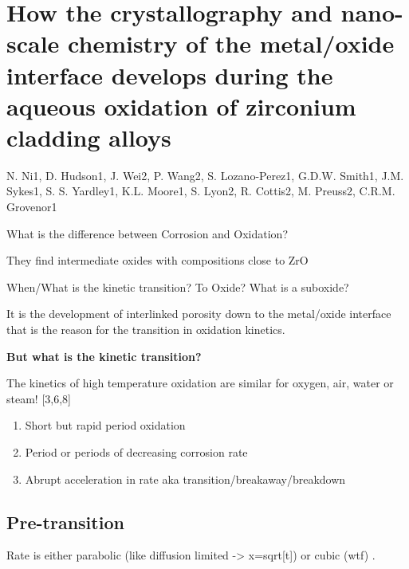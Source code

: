 \section{How the crystallography and nano-scale chemistry of the
metal/oxide interface develops during the aqueous oxidation of zirconium
cladding alloys}

N. Ni1, D. Hudson1, J. Wei2, P. Wang2, S. Lozano-Perez1, G.D.W. Smith1,
J.M. Sykes1, S. S. Yardley1, K.L. Moore1, S. Lyon2, R. Cottis2, M.
Preuss2, C.R.M. Grovenor1

What is the difference between Corrosion and Oxidation?

They find intermediate oxides with compositions close to ZrO

When/What is the kinetic transition? To Oxide? What is a suboxide?

It is the development of interlinked porosity down to the metal/oxide
interface that is the reason for the transition in oxidation kinetics.

\textbf{But what is the kinetic transition?}

The kinetics of high temperature oxidation are similar for oxygen, air,
water or steam! {[}3,6,8{]}

\begin{enumerate}[1.]
\item
  Short but rapid period oxidation
\item
  Period or periods of decreasing corrosion rate
\item
  Abrupt acceleration in rate aka transition/breakaway/breakdown
\end{enumerate}

\subsection{Pre-transition}

Rate is either parabolic (like diffusion limited -\textgreater{}
x=sqrt{[}t{]}) or cubic (wtf) .
